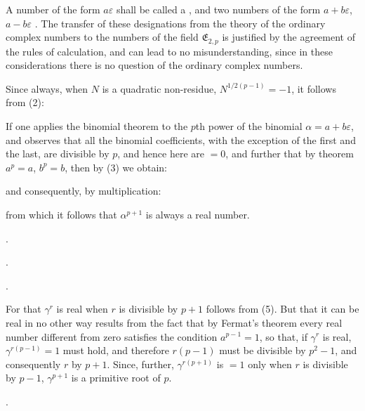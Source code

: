 
A number of the form $a\varepsilon$ shall be called a 
, and two numbers of the form $a+b\varepsilon$, $a-b\varepsilon$ 
. The transfer of these designations
from the theory of the ordinary complex numbers
to the numbers of the field $\mathfrak{E}_{2,p}$ is justified by the
agreement of the rules of calculation, and can lead to no misunderstanding,
since in these considerations there is no
question of the ordinary complex numbers.

Since always, when $N$ is a quadratic non-residue,
$N^{1/2(p-1)}=-1$, it follows from (2):


If one applies the binomial theorem to the $p$th power of the
binomial $\alpha=a+b\varepsilon$, and observes that all the binomial coefficients,
with the exception of the first and the last, are divisible
by $p$, and hence here are $=0$, and further that by 
theorem $a^p=a$, $b^p=b$, then by (3) we obtain:

and consequently, by multiplication:

from which it follows that $\alpha^{p+1}$ is always a real number.

.

.

.

For that $\gamma^r$ is real when $r$ is divisible by $p+1$
follows from (5). But that it can be real in no other way results
from the fact that by Fermat's theorem every real number
different from zero satisfies the condition $a^{p-1}=1$, so that,
if $\gamma^r$ is real, $\gamma^{r(p-1)}=1$ must hold, and therefore
$r(p-1)$ must be divisible by $p^2-1$, and consequently $r$ by $p+1$.
Since, further, $\gamma^{r(p+1)}$ is $=1$ only when $r$ is divisible by $p-1$,
$\gamma^{p+1}$ is a primitive root of $p$.

.

